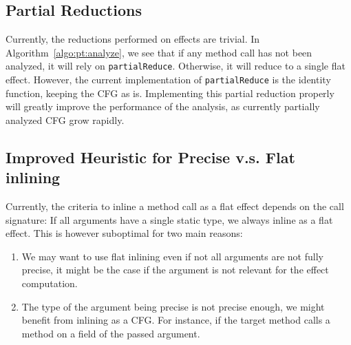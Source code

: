 \documentclass[a4paper]{article}
\begin{document}
\subsection{Partial Reductions}
Currently, the reductions performed on effects are trivial. In
Algorithm~\ref{algo:pt:analyze}, we see that if any method call has not been
analyzed, it will rely on \verb=partialReduce=. Otherwise, it will reduce to a
single flat effect. However, the current implementation of \verb=partialReduce=
is the identity function, keeping the CFG as is. Implementing this partial
reduction properly will greatly improve the performance of the analysis, as
currently partially analyzed CFG grow rapidly.

\subsection{Improved Heuristic for Precise v.s. Flat inlining}
Currently, the criteria to inline a method call as a flat effect depends on the
call signature: If all arguments have a single static type, we always inline as
a flat effect. This is however suboptimal for two main reasons:
\begin{enumerate}
    \item We may want to use flat inlining even if not all arguments are not fully
precise, it might be the case if the argument is not relevant for the effect
computation.
    \item The type of the argument being precise is not precise enough, we might
benefit from inlining as a CFG. For instance, if the target method calls a
method on a field of the passed argument.
\end{enumerate}
\end{document}
